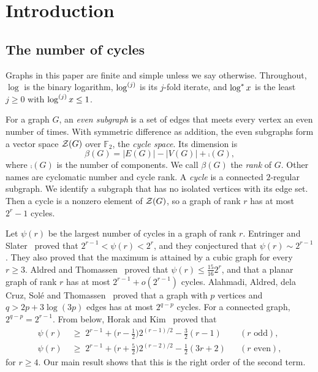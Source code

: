 \section{Introduction}\label{sec:intro}

\subsection{The number of cycles}

Graphs in this paper are finite and simple unless we say otherwise. Throughout, $\log$ is the
binary logarithm, $\log^{(j)}$ is its $j$-fold iterate, and $\log^{*} x$ is the least $j\ge0$ with
$\log^{(j)}x\le1$.

For a graph $G$, an \emph{even subgraph} is a set of edges that meets every vertex an even number of
times. With symmetric difference as addition, the even subgraphs form a vector space $\mathcal{Z}(G)$ over
$\mathbb{F}_2$, the \emph{cycle space}. Its dimension is
\[
  \beta(G)=|E(G)|-|V(G)|+\comp(G),
\]
where $\comp(G)$ is the number of components. We call $\beta(G)$ the \emph{rank} of $G$. Other names
are cyclomatic number and cycle rank. A \emph{cycle} is a connected $2$-regular subgraph. We
identify a subgraph that has no isolated vertices with its edge set. Then a cycle is a nonzero
element of $\mathcal{Z}(G)$, so a graph of rank $r$ has at most $2^{r}-1$ cycles.

Let $\psi(r)$ be the largest number of cycles in a graph of rank $r$. Entringer and
Slater~\cite{ES} proved that $2^{r-1}<\psi(r)<2^{r}$, and they conjectured that
$\psi(r)\sim2^{r-1}$. They also proved that the maximum is attained by a cubic graph for every
$r\ge3$. Aldred and Thomassen~\cite{AT} proved that $\psi(r)\le\frac{15}{16}2^{r}$, and that a
planar graph of rank $r$ has at most $2^{r-1}+o(2^{r-1})$ cycles. Alahmadi, Aldred, dela Cruz,
Sol\'e and Thomassen~\cite{AACST} proved that a graph with $p$ vertices and $q>2p+3\log(3p)$ edges
has at most $2^{q-p}$ cycles. For a connected graph, $2^{q-p}=2^{r-1}$. From below, Horak and
Kim~\cite{HK} proved that
\begin{equation}\label{eq:hk}
\begin{aligned}
  \psi(r)&\;\ge\;2^{r-1}+\bigl(r-\tfrac12\bigr)2^{(r-1)/2}-\tfrac32(r-1)&&(r\text{ odd}),\\
  \psi(r)&\;\ge\;2^{r-1}+\bigl(r+\tfrac52\bigr)2^{(r-2)/2}-\tfrac12(3r+2)&&(r\text{ even}),
\end{aligned}
\end{equation}
for $r\ge4$. Our main result shows that this is the right order of the second term.

